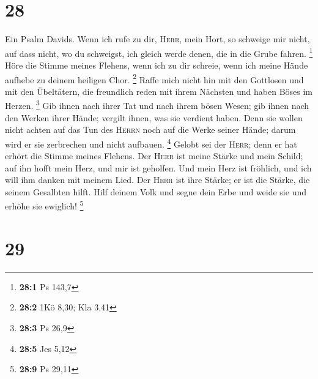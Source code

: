 \hypertarget{section-13}{%
\section{28}\label{section-13}}

 Ein Psalm Davids. Wenn ich rufe zu dir, \textsc{Herr},
mein Hort, so schweige mir nicht, auf dass nicht, wo du schweigst, ich
gleich werde denen, die in die Grube fahren. \footnote{\textbf{28:1} Ps
  143,7}  Höre die Stimme meines Flehens, wenn ich zu dir
schreie, wenn ich meine Hände aufhebe zu deinem heiligen Chor.
\footnote{\textbf{28:2} 1Kö 8,30; Kla 3,41}  Raffe mich
nicht hin mit den Gottlosen und mit den Übeltätern, die freundlich reden
mit ihrem Nächsten und haben Böses im Herzen. \footnote{\textbf{28:3} Ps
  26,9}  Gib ihnen nach ihrer Tat und nach ihrem bösen
Wesen; gib ihnen nach den Werken ihrer Hände; vergilt ihnen, was sie
verdient haben.  Denn sie wollen nicht achten auf das Tun
des \textsc{Herrn} noch auf die Werke seiner Hände; darum wird er sie
zerbrechen und nicht aufbauen. \footnote{\textbf{28:5} Jes 5,12}
 Gelobt sei der \textsc{Herr}; denn er hat erhört die
Stimme meines Flehens.  Der \textsc{Herr} ist meine Stärke
und mein Schild; auf ihn hofft mein Herz, und mir ist geholfen. Und mein
Herz ist fröhlich, und ich will ihm danken mit meinem Lied.
 Der \textsc{Herr} ist ihre Stärke; er ist die Stärke, die
seinem Gesalbten hilft.  Hilf deinem Volk und segne dein
Erbe und weide sie und erhöhe sie ewiglich! \footnote{\textbf{28:9} Ps
  29,11}

\hypertarget{section-14}{%
\section{29}\label{section-14}}

